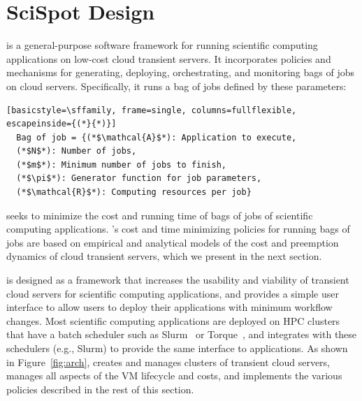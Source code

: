 \section{SciSpot Design}
\label{sec:design}





\sysname is a general-purpose software framework for running scientific computing applications on low-cost cloud transient servers.
It incorporates policies and mechanisms for generating, deploying, orchestrating, and monitoring bags of jobs on cloud servers.
Specifically, it runs a bag of jobs defined by these parameters:
\begin{lstlisting}[basicstyle=\sffamily, frame=single, columns=fullflexible, escapeinside={(*}{*)}]
  Bag of job = {(*$\mathcal{A}$*): Application to execute,
  (*$N$*): Number of jobs,
  (*$m$*): Minimum number of jobs to finish,
  (*$\pi$*): Generator function for job parameters,
  (*$\mathcal{R}$*): Computing resources per job}
\end{lstlisting}



\sysname seeks to minimize the cost and running time of bags of jobs of scientific computing applications.
\sysname's cost and time minimizing policies for running bags of jobs are based on empirical and analytical models of the cost and preemption dynamics of cloud transient servers, which we present in the next section. 

\sysname is designed as a framework that increases the usability and viability of transient cloud servers for scientific computing applications, and provides a simple user interface to allow users to deploy their applications with minimum workflow changes. 
Most scientific computing applications are deployed on HPC clusters that have a batch scheduler such as Slurm~\cite{slurm} or Torque~\cite{torque}, and \sysname integrates with these schedulers (e.g., Slurm) to provide the same interface to applications. 
As shown in Figure~\ref{fig:arch},
\sysname creates and manages clusters of transient cloud servers, manages all aspects of the VM lifecycle and costs, and implements the various policies described in the rest of this section. 

